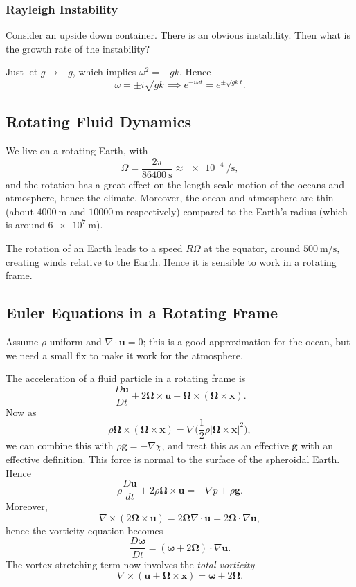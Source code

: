 \documentclass[12pt]{article}
\begin{document}
\subsubsection{Rayleigh Instability}
\label{subsub:rayleigh_instability}

Consider an upside down container. There is an obvious instability. Then what is the growth rate of the instability?

Just let $g \to -g$, which implies $\omega^2 = - gk$. Hence
\[
	\omega = \pm i \sqrt{gk} \implies e^{-i \omega t} = e^{\pm \sqrt{gk} t}.
\]

\subsection{Rotating Fluid Dynamics}
\label{sub:rotating_fluid_dynamics}

We live on a rotating Earth, with
\[
	\Omega = \frac{2\pi}{\qty{86400}{\second}} \approx \qty{e-4}{\per \second},
\]
and the rotation has a great effect on the length-scale motion of the oceans and atmosphere, hence the climate. Moreover, the ocean and atmosphere are thin (about $\qty{4000}{\metre}$ and $\qty{10000}{\metre}$ respectively) compared to the Earth's radius (which is around $\qty{6e7}{\metre}$).

The rotation of an Earth leads to a speed $R \Omega$ at the equator, around $\qty{500}{\metre \per \second}$, creating winds relative to the Earth. Hence it is sensible to work in a rotating frame. 

\subsection{Euler Equations in a Rotating Frame}
\label{sub:euler_equations_in_a_rotating_frame}

Assume $\rho$ uniform and $\nabla \cdot \mathbf{u} = 0$; this is a good approximation for the ocean, but we need a small fix to make it work for the atmosphere.

The acceleration of a fluid particle in a rotating frame is
\[
\frac{D \mathbf{u}}{D t} + 2 \bm{\Omega} \times \mathbf{u} + \bm{\Omega} \times (\bm{\Omega} \times \mathbf{x}).
\]
Now as
\[
\rho \bm{\Omega} \times (\bm{\Omega} \times \mathbf{x}) = \nabla \biggl( \frac{1}{2} \rho |\bm{\Omega} \times \mathbf{x}|^2 \biggr),
\]
we can combine this with $\rho \mathbf{g} = - \nabla \chi$, and treat this as an effective $\mathbf{g}$ with an effective definition. This force is normal to the surface of the spheroidal Earth. Hence
\[
	\rho \frac{D \mathbf{u}}{d t} + 2 \rho \bm{\Omega} \times \mathbf{u} = - \nabla p + \rho \mathbf{g}.
\]
Moreover,
\[
\nabla \times (2 \bm{\Omega} \times \mathbf{u}) = 2 \bm{\Omega} \nabla \cdot \mathbf{u} = 2 \bm{\Omega} \cdot \nabla \mathbf{u},
\]
hence the vorticity equation becomes
\[
\frac{D \bm{\omega}}{D t} = (\bm{\omega} + 2 \bm{\Omega}) \cdot \nabla \mathbf{u}.
\]
The vortex stretching term now involves the \emph{total vorticity}
\[
\nabla \times (\mathbf{u} + \bm{\Omega} \times \mathbf{x}) = \bm{\omega} + 2 \bm{\Omega}.
\]
\end{document}
